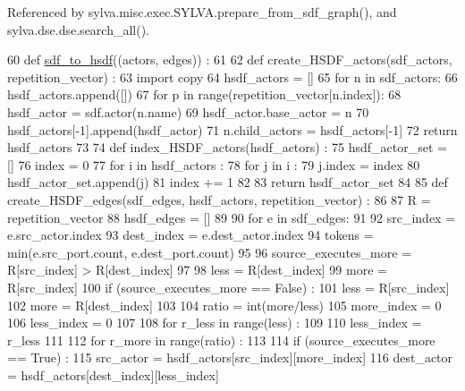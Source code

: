 Referenced by sylva.\+misc.\+exec.\+S\+Y\+L\+V\+A.\+prepare\+\_\+from\+\_\+sdf\+\_\+graph(), and sylva.\+dse.\+dse.\+search\+\_\+all().


\begin{DoxyCode}
60 \textcolor{keyword}{def }\hyperlink{namespacesylva_1_1base_1_1sdf__to__hsdf_a41dda1a461cf7b083fbd682fc94d5e10}{sdf\_to\_hsdf}((actors, edges)) :
61 
62   \textcolor{keyword}{def }create\_HSDF\_actors(sdf\_actors, repetition\_vector) :
63     \textcolor{keyword}{import} copy
64     hsdf\_actors = []
65     \textcolor{keywordflow}{for} n \textcolor{keywordflow}{in} sdf\_actors:
66       hsdf\_actors.append([])
67       \textcolor{keywordflow}{for} p \textcolor{keywordflow}{in} range(repetition\_vector[n.index]):
68         hsdf\_actor = sdf.actor(n.name)
69         hsdf\_actor.base\_actor = n
70         hsdf\_actors[-1].append(hsdf\_actor)
71       n.child\_actors = hsdf\_actors[-1]
72     \textcolor{keywordflow}{return} hsdf\_actors
73 
74   \textcolor{keyword}{def }index\_HSDF\_actors(hsdf\_actors) :
75     hsdf\_actor\_set = []
76     index = 0
77     \textcolor{keywordflow}{for} i \textcolor{keywordflow}{in} hsdf\_actors :
78       \textcolor{keywordflow}{for} j \textcolor{keywordflow}{in} i :
79         j.index = index
80         hsdf\_actor\_set.append(j)
81         index += 1
82 
83     \textcolor{keywordflow}{return} hsdf\_actor\_set
84 
85   \textcolor{keyword}{def }create\_HSDF\_edges(sdf\_edges, hsdf\_actors, repetition\_vector) :
86 
87     R = repetition\_vector
88     hsdf\_edges = []
89 
90     \textcolor{keywordflow}{for} e \textcolor{keywordflow}{in} sdf\_edges:
91 
92       src\_index = e.src\_actor.index
93       dest\_index = e.dest\_actor.index
94       tokens = min(e.src\_port.count, e.dest\_port.count)
95 
96       source\_executes\_more = R[src\_index] > R[dest\_index]
97 
98       less = R[dest\_index]
99       more = R[src\_index]
100       \textcolor{keywordflow}{if} (source\_executes\_more == \textcolor{keyword}{False}) :
101         less = R[src\_index]
102         more = R[dest\_index]
103 
104       ratio = int(more/less)
105       more\_index = 0
106       less\_index = 0
107 
108       \textcolor{keywordflow}{for} r\_less \textcolor{keywordflow}{in} range(less) :
109 
110         less\_index = r\_less
111 
112         \textcolor{keywordflow}{for} r\_more \textcolor{keywordflow}{in} range(ratio) :
113 
114           \textcolor{keywordflow}{if} (source\_executes\_more == \textcolor{keyword}{True}) :
115             src\_actor = hsdf\_actors[src\_index][more\_index]
116             dest\_actor = hsdf\_actors[dest\_index][less\_index]

\end{DoxyCode}
